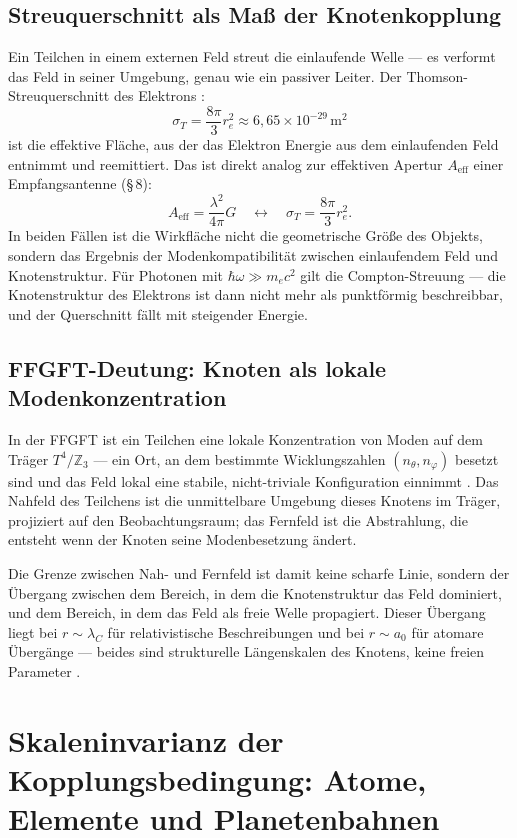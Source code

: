 \subsection*{Streuquerschnitt als Maß der Knotenkopplung}

Ein Teilchen in einem externen Feld streut die einlaufende Welle ---
es verformt das Feld in seiner Umgebung, genau wie ein passiver Leiter.
Der Thomson-Streuquerschnitt des Elektrons \cite{Jackson1999}:
\[
  \sigma_T = \frac{8\pi}{3}r_e^2 \approx 6{,}65\times 10^{-29}\,\mathrm{m}^2
\]
ist die effektive Fläche, aus der das Elektron Energie aus dem
einlaufenden Feld entnimmt und reemittiert. Das ist direkt analog zur
effektiven Apertur $A_\mathrm{eff}$ einer Empfangsantenne (§\,8):
\[
  A_\mathrm{eff} = \frac{\lambda^2}{4\pi}G
  \quad \longleftrightarrow \quad
  \sigma_T = \frac{8\pi}{3}r_e^2.
\]
In beiden Fällen ist die Wirkfläche nicht die geometrische Größe des
Objekts, sondern das Ergebnis der Modenkompatibilität zwischen
einlaufendem Feld und Knotenstruktur. Für Photonen mit $\hbar\omega
\gg m_e c^2$ gilt die Compton-Streuung --- die Knotenstruktur des
Elektrons ist dann nicht mehr als punktförmig beschreibbar, und der
Querschnitt fällt mit steigender Energie.

\subsection*{FFGFT-Deutung: Knoten als lokale Modenkonzentration}

In der FFGFT ist ein Teilchen eine lokale Konzentration von Moden auf
dem Träger $T^4/\mathbb{Z}_3$ --- ein Ort, an dem bestimmte
Wicklungszahlen $(n_\theta, n_\varphi)$ besetzt sind und das Feld
lokal eine stabile, nicht-triviale Konfiguration einnimmt \SetzM.
Das Nahfeld des Teilchens ist die unmittelbare Umgebung dieses Knotens
im Träger, projiziert auf den Beobachtungsraum; das Fernfeld ist die
Abstrahlung, die entsteht wenn der Knoten seine Modenbesetzung ändert.

Die Grenze zwischen Nah- und Fernfeld ist damit keine scharfe Linie,
sondern der Übergang zwischen dem Bereich, in dem die Knotenstruktur
das Feld dominiert, und dem Bereich, in dem das Feld als freie Welle
propagiert. Dieser Übergang liegt bei $r\sim\lambda_C$ für relativistische
Beschreibungen und bei $r\sim a_0$ für atomare Übergänge --- beides
sind strukturelle Längenskalen des Knotens, keine freien Parameter \SM.

\section{Skaleninvarianz der Kopplungsbedingung: Atome, Elemente und Planetenbahnen}

